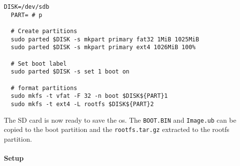 \begin{lstlisting}[style=bash, caption={}, label=lst:create_partitions]
  DISK=/dev/sdb
  PART= # p

  # Create partitions
  sudo parted $DISK -s mkpart primary fat32 1MiB 1025MiB
  sudo parted $DISK -s mkpart primary ext4 1026MiB 100%

  # Set boot label
  sudo parted $DISK -s set 1 boot on

  # format partitions
  sudo mkfs -t vfat -F 32 -n boot $DISK${PART}1
  sudo mkfs -t ext4 -L rootfs $DISK${PART}2
\end{lstlisting}

The SD card is now ready to save the \acrshort{os}.
The \texttt{BOOT.BIN} and \texttt{Image.ub} can be copied to the boot partition and the \texttt{rootfs.tar.gz} extracted to the rootfs partition.

\paragraph{Setup}
